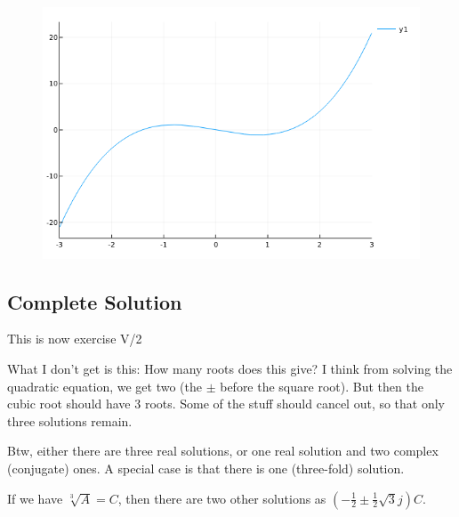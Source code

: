 \begin{figure}[H]
	\includegraphics[scale=0.7]{images/cubic_01.png}
\end{figure}

\subsection{Complete Solution}

This is now exercise V/2


What I don't get is this: How many roots does this give? I think from solving the quadratic equation, we get two (the $\pm$ before the square root). But then the cubic root should have 3 roots. Some of the stuff should cancel out, so that only three solutions remain.

 Btw, either there are three real solutions, or one real solution and two complex (conjugate) ones. A special case is that there is one (three-fold) solution.
 
 If we have $\sqrt[3]{A} = C$, then there are two other solutions as $\left(-\frac{1}{2} \pm \frac{1}{2}\sqrt{3}j\right)C$.


